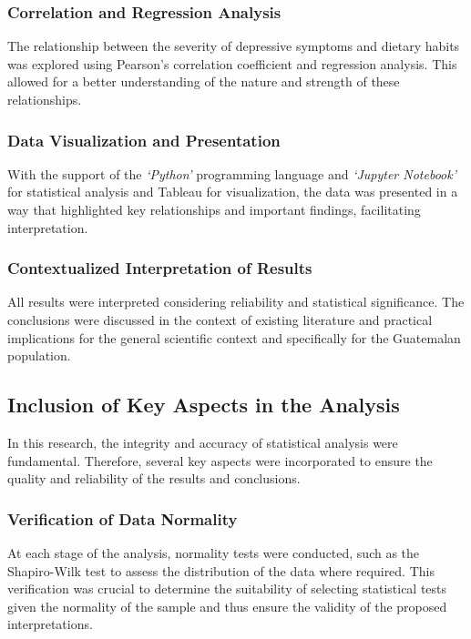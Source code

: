 \documentclass[jou]{apa7}
\begin{document}
\subsubsection{Correlation and Regression Analysis}
The relationship between the severity of depressive symptoms and dietary habits was explored using Pearson's correlation coefficient and regression analysis. This allowed for a better understanding of the nature and strength of these relationships.

\subsubsection{Data Visualization and Presentation}
With the support of the \emph{`Python'} programming language and \emph{`Jupyter Notebook'} for statistical analysis and Tableau for visualization, the data was presented in a way that highlighted key relationships and important findings, facilitating interpretation.

\subsubsection{Contextualized Interpretation of Results}
All results were interpreted considering reliability and statistical significance. The conclusions were discussed in the context of existing literature and practical implications for the general scientific context and specifically for the Guatemalan population.

\subsection{Inclusion of Key Aspects in the Analysis}\label{inclusiuxf3n-de-aspectos-clave-en-el-anuxe1lisis}

In this research, the integrity and accuracy of statistical analysis were fundamental. Therefore, several key aspects were incorporated to ensure the quality and reliability of the results and conclusions.\\

\subsubsection{Verification of Data Normality}
At each stage of the analysis, normality tests were conducted, such as the Shapiro-Wilk test to assess the distribution of the data where required. This verification was crucial to determine the suitability of selecting statistical tests given the normality of the sample and thus ensure the validity of the proposed interpretations.
\end{document}
